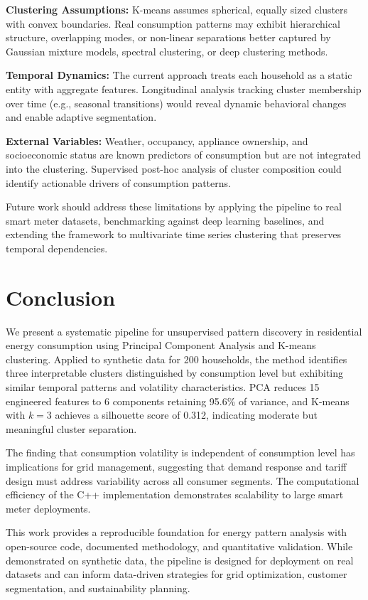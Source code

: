 \documentclass[11pt]{article}
\begin{document}
\textbf{Clustering Assumptions:} K-means assumes spherical, equally sized clusters with convex boundaries. Real consumption patterns may exhibit hierarchical structure, overlapping modes, or non-linear separations better captured by Gaussian mixture models, spectral clustering, or deep clustering methods.

\textbf{Temporal Dynamics:} The current approach treats each household as a static entity with aggregate features. Longitudinal analysis tracking cluster membership over time (e.g., seasonal transitions) would reveal dynamic behavioral changes and enable adaptive segmentation.

\textbf{External Variables:} Weather, occupancy, appliance ownership, and socioeconomic status are known predictors of consumption but are not integrated into the clustering. Supervised post-hoc analysis of cluster composition could identify actionable drivers of consumption patterns.

Future work should address these limitations by applying the pipeline to real smart meter datasets, benchmarking against deep learning baselines, and extending the framework to multivariate time series clustering that preserves temporal dependencies.

\section{Conclusion}

We present a systematic pipeline for unsupervised pattern discovery in residential energy consumption using Principal Component Analysis and K-means clustering. Applied to synthetic data for 200 households, the method identifies three interpretable clusters distinguished by consumption level but exhibiting similar temporal patterns and volatility characteristics. PCA reduces 15 engineered features to 6 components retaining 95.6\% of variance, and K-means with $k=3$ achieves a silhouette score of 0.312, indicating moderate but meaningful cluster separation.

The finding that consumption volatility is independent of consumption level has implications for grid management, suggesting that demand response and tariff design must address variability across all consumer segments. The computational efficiency of the C++ implementation demonstrates scalability to large smart meter deployments.

This work provides a reproducible foundation for energy pattern analysis with open-source code, documented methodology, and quantitative validation. While demonstrated on synthetic data, the pipeline is designed for deployment on real datasets and can inform data-driven strategies for grid optimization, customer segmentation, and sustainability planning.
\end{document}
